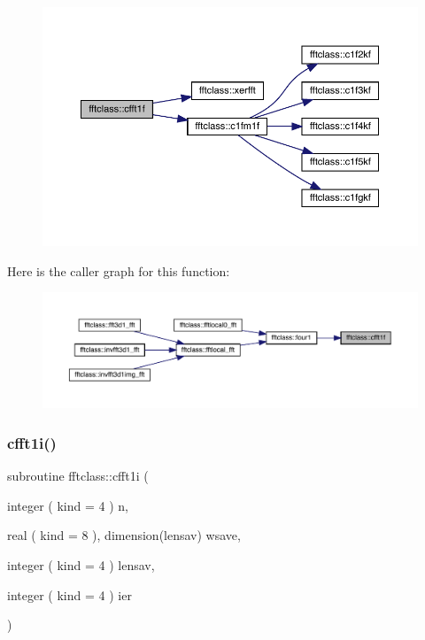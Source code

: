 \begin{figure}[H]
\begin{center}
\leavevmode
\includegraphics[width=350pt]{namespacefftclass_a8ecbd8fa5a63e3cef089dbe7e91c6438_cgraph}
\end{center}
\end{figure}
Here is the caller graph for this function\+:\nopagebreak
\begin{figure}[H]
\begin{center}
\leavevmode
\includegraphics[width=350pt]{namespacefftclass_a8ecbd8fa5a63e3cef089dbe7e91c6438_icgraph}
\end{center}
\end{figure}
\mbox{\label{namespacefftclass_a7aaa42c1b45fc7175f2560cd023e4487}} 
\subsubsection{\texorpdfstring{cfft1i()}{cfft1i()}}
{\footnotesize\ttfamily subroutine fftclass\+::cfft1i (\begin{DoxyParamCaption}\item[{integer ( kind = 4 )}]{n,  }\item[{real ( kind = 8 ), dimension(lensav)}]{wsave,  }\item[{integer ( kind = 4 )}]{lensav,  }\item[{integer ( kind = 4 )}]{ier }\end{DoxyParamCaption})}



